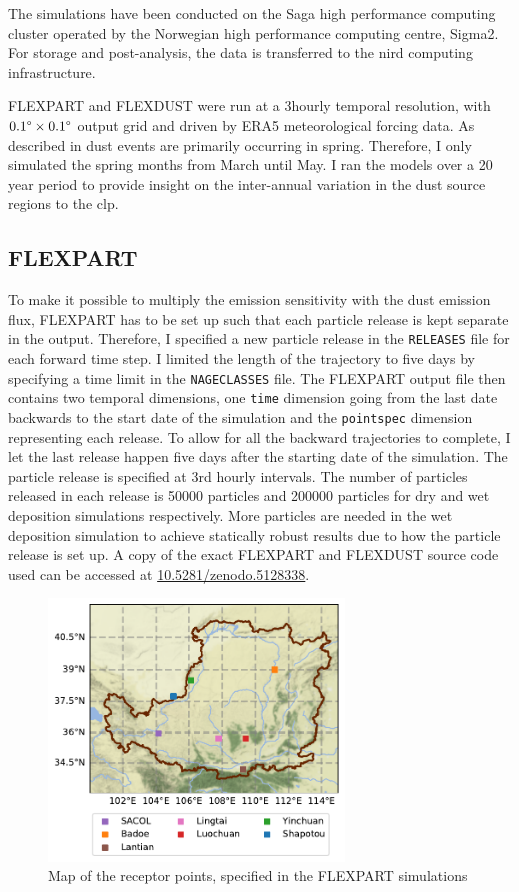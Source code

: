 The simulations have been conducted on the Saga high performance computing cluster operated by the Norwegian high performance 
computing centre, Sigma2. For storage and post-analysis, the data is transferred to the 
\acrfull{nird} computing infrastructure. 

FLEXPART and FLEXDUST were run at a 3hourly temporal resolution, with $0.1\degree \times 0.1\degree$ output grid and driven by  ERA5 meteorological forcing data. 
As described in  dust events are primarily occurring in spring. 
Therefore, I only simulated the spring months from March until May.  I ran the models over a 20 year period to provide insight on the inter-annual variation in the dust source regions to the \acrshort{clp}.   
\subsection{FLEXPART}
To make it possible to multiply the emission sensitivity with the dust emission flux, FLEXPART has to be set up such that each particle release is kept separate in the output. 
Therefore, I  specified a new particle release in the \verb|RELEASES| file for each forward time step. I limited the length of the trajectory to five days by specifying a time limit in the \verb|NAGECLASSES| file.
The FLEXPART output file then contains two temporal dimensions, one \verb|time| dimension going from the last date backwards to the start date of the simulation and the \verb|pointspec| dimension representing each release. 
To allow for all the backward trajectories to complete, I let the last release happen five days after the starting date of the simulation.   
The particle release is specified at 3rd hourly intervals. The number of particles released in each release is 50000 particles and 200000 particles for dry and wet deposition simulations respectively. 
More particles are needed in the wet deposition simulation to achieve statically robust results due to how the particle release is set up.  
A copy of the exact FLEXPART and FLEXDUST source code used can be accessed at \url{10.5281/zenodo.5128338}. 
\begin{figure}[htpb]
    \centering
    \includegraphics[width=0.7\textwidth]{texfiles/figs/map_loess.pdf}
    \caption{Map of the receptor points, specified in the FLEXPART simulations}
    \label{fig:maps_clp_location}
\end{figure}

